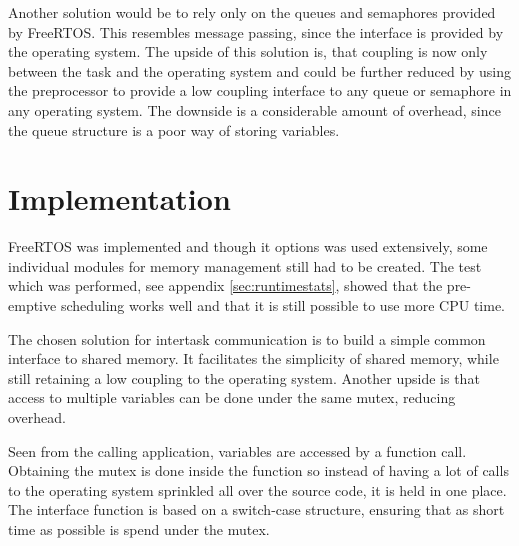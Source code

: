 Another solution would be to rely only on the queues and semaphores provided by
FreeRTOS. This resembles message passing, since the interface is provided by the
operating system. The upside of this solution is, that coupling is now only
between the task and the operating system and could be further reduced by using
the preprocessor to provide a low coupling interface to any queue or semaphore
in any operating system. The downside is a considerable amount of overhead,
since the queue structure is a poor way of storing variables.


\section{Implementation}
FreeRTOS was implemented and though it options was used extensively,
 some individual modules for memory management still had to be created. 
 The test which was performed, see appendix \ref{sec:runtimestats}, showed that the pre-emptive
 scheduling works well and that it is still possible to use more CPU time. 


The chosen solution for intertask communication is to build a simple common interface to shared memory. It
facilitates the simplicity of shared memory, while still retaining a low
coupling to the operating system. Another upside is that access to multiple
variables can be done under the same mutex, reducing overhead.


Seen from the calling application, variables are accessed by a function call.
Obtaining the mutex is done inside the function so instead of having a lot of
calls to the operating system sprinkled all over the source code, it is held in
one place. The interface function is based on a switch-case structure, ensuring
that as short time as possible is spend under the mutex.
